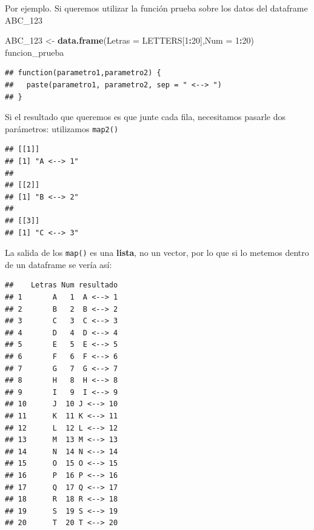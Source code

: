 \documentclass[]{book}
\newenvironment{Shaded}{\begin{snugshade}}{\end{snugshade}}
\newcommand{\DataTypeTok}[1]{\textcolor[rgb]{0.13,0.29,0.53}{#1}}
\newcommand{\DecValTok}[1]{\textcolor[rgb]{0.00,0.00,0.81}{#1}}
\newcommand{\KeywordTok}[1]{\textcolor[rgb]{0.13,0.29,0.53}{\textbf{#1}}}
\newcommand{\NormalTok}[1]{#1}
\newcommand{\OperatorTok}[1]{\textcolor[rgb]{0.81,0.36,0.00}{\textbf{#1}}}
\newcommand{\StringTok}[1]{\textcolor[rgb]{0.31,0.60,0.02}{#1}}
\begin{document}
Por ejemplo. Si queremos utilizar la función prueba sobre los datos del dataframe ABC\_123

\begin{Shaded}
\begin{Highlighting}[]
\NormalTok{ABC_}\DecValTok{123}\NormalTok{ <-}\StringTok{ }\KeywordTok{data.frame}\NormalTok{(}\DataTypeTok{Letras =}\NormalTok{ LETTERS[}\DecValTok{1}\OperatorTok{:}\DecValTok{20}\NormalTok{],}\DataTypeTok{Num =} \DecValTok{1}\OperatorTok{:}\DecValTok{20}\NormalTok{)}
\NormalTok{funcion_prueba}
\end{Highlighting}
\end{Shaded}

\begin{verbatim}
## function(parametro1,parametro2) {
##   paste(parametro1, parametro2, sep = " <--> ")
## }
\end{verbatim}

Si el resultado que queremos es que junte cada fila, necesitamos pasarle dos parámetros: utilizamos \texttt{map2()}

\begin{Shaded}
\end{Shaded}

\begin{verbatim}
## [[1]]
## [1] "A <--> 1"
## 
## [[2]]
## [1] "B <--> 2"
## 
## [[3]]
## [1] "C <--> 3"
\end{verbatim}

La salida de los \texttt{map()} es una \textbf{lista}, no un vector, por lo que si lo metemos dentro de un dataframe se vería así:

\begin{Shaded}
\end{Shaded}

\begin{verbatim}
##    Letras Num resultado
## 1       A   1  A <--> 1
## 2       B   2  B <--> 2
## 3       C   3  C <--> 3
## 4       D   4  D <--> 4
## 5       E   5  E <--> 5
## 6       F   6  F <--> 6
## 7       G   7  G <--> 7
## 8       H   8  H <--> 8
## 9       I   9  I <--> 9
## 10      J  10 J <--> 10
## 11      K  11 K <--> 11
## 12      L  12 L <--> 12
## 13      M  13 M <--> 13
## 14      N  14 N <--> 14
## 15      O  15 O <--> 15
## 16      P  16 P <--> 16
## 17      Q  17 Q <--> 17
## 18      R  18 R <--> 18
## 19      S  19 S <--> 19
## 20      T  20 T <--> 20
\end{verbatim}
\end{document}
